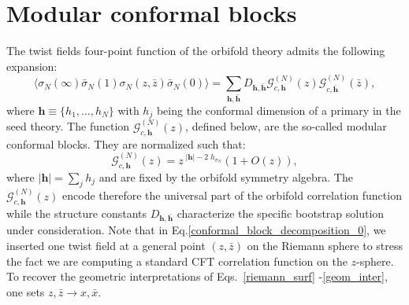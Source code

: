 \documentclass[a4paper,11pt]{article}
\begin{document}
\section{Modular conformal blocks}\label{sec:conf_blocks}
The twist fields four-point 
function of the orbifold theory admits the following expansion:
\begin{equation}\label{conformal_block_decomposition_0}
 \langle \sigma_N (\infty)  \bar{\sigma}_N(1) \sigma_N (z, \bar{z})\bar{\sigma}_N(0)\rangle=
 \sum_{\boldsymbol{h},\boldsymbol{\bar{h}}} D_{\boldsymbol{h}, \boldsymbol{\bar{h}}}
 \mathcal{G}_{c, \boldsymbol{h}}^{(N)}(z)\mathcal{G}_{c,\boldsymbol{\bar{h}}}^{(N)}(\bar{z}),
\end{equation}
where $\boldsymbol{h}\equiv\{h_1, \dots, h_N\}$ with $h_j$ being the conformal dimension of  
a primary in the seed theory.
The function $\mathcal{G}_{c, \boldsymbol{h}}^{(N)}(z)$, defined below, are the so-called modular conformal blocks.  They are normalized such that: 
\begin{equation}
\label{G_asy}
\mathcal{G}_{c, \boldsymbol{h}}^{(N)}(z)=z^{\;|\boldsymbol{h}| -2\; h_{\sigma_N}}\left(1+ O(z)\right),
\end{equation}
where $|\boldsymbol{h}|=\sum_j h_j$ and are fixed by the orbifold symmetry algebra. The $\mathcal{G}_{c, \boldsymbol{h}}^{(N)}(z)$ encode therefore the universal part of the orbifold correlation function  while  the structure constants  $D_{\boldsymbol{h}, \boldsymbol{\bar{h}}}$  characterize the specific bootstrap solution under consideration. Note that in Eq.\eqref{conformal_block_decomposition_0}, we inserted one twist field at a general point $(z,\bar{z})$ on the Riemann sphere to stress the fact we are computing a standard CFT correlation function on the $z$-sphere. To recover the geometric interpretations of Eqs.~\eqref{riemann_surf} -\eqref{geom_inter}, one sets $z,\bar{z}\to x,\bar{x}$.
\end{document}
